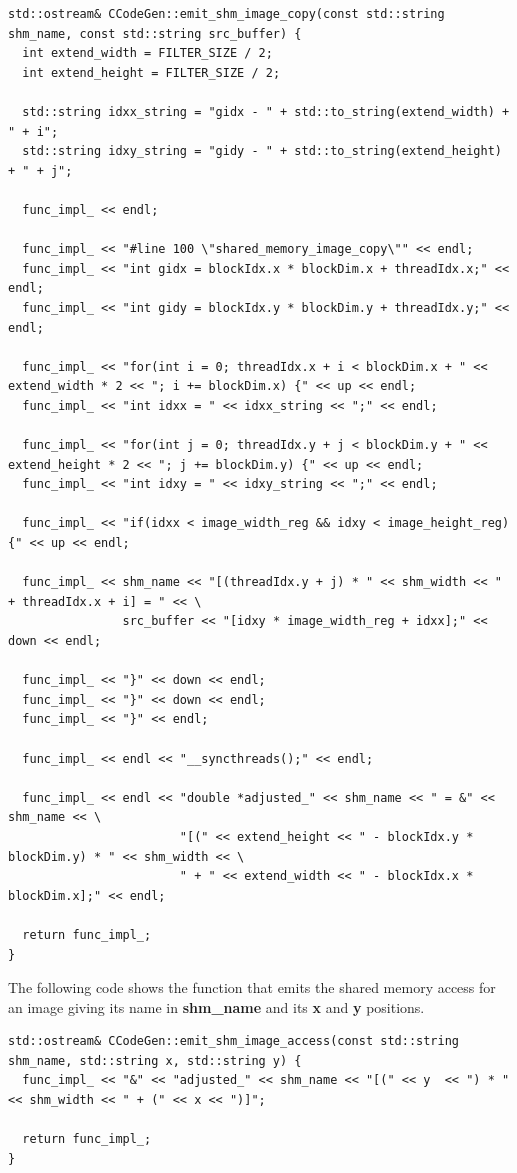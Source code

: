 \documentclass{article}
\begin{document}
\begin{verbatim}
std::ostream& CCodeGen::emit_shm_image_copy(const std::string shm_name, const std::string src_buffer) {
  int extend_width = FILTER_SIZE / 2;
  int extend_height = FILTER_SIZE / 2;

  std::string idxx_string = "gidx - " + std::to_string(extend_width) + " + i";
  std::string idxy_string = "gidy - " + std::to_string(extend_height) + " + j";

  func_impl_ << endl;

  func_impl_ << "#line 100 \"shared_memory_image_copy\"" << endl;
  func_impl_ << "int gidx = blockIdx.x * blockDim.x + threadIdx.x;" << endl;
  func_impl_ << "int gidy = blockIdx.y * blockDim.y + threadIdx.y;" << endl;

  func_impl_ << "for(int i = 0; threadIdx.x + i < blockDim.x + " << extend_width * 2 << "; i += blockDim.x) {" << up << endl;
  func_impl_ << "int idxx = " << idxx_string << ";" << endl;

  func_impl_ << "for(int j = 0; threadIdx.y + j < blockDim.y + " << extend_height * 2 << "; j += blockDim.y) {" << up << endl;
  func_impl_ << "int idxy = " << idxy_string << ";" << endl;

  func_impl_ << "if(idxx < image_width_reg && idxy < image_height_reg) {" << up << endl;

  func_impl_ << shm_name << "[(threadIdx.y + j) * " << shm_width << " + threadIdx.x + i] = " << \
                src_buffer << "[idxy * image_width_reg + idxx];" << down << endl;

  func_impl_ << "}" << down << endl;
  func_impl_ << "}" << down << endl;
  func_impl_ << "}" << endl;

  func_impl_ << endl << "__syncthreads();" << endl;

  func_impl_ << endl << "double *adjusted_" << shm_name << " = &" << shm_name << \
                        "[(" << extend_height << " - blockIdx.y * blockDim.y) * " << shm_width << \
                        " + " << extend_width << " - blockIdx.x * blockDim.x];" << endl;

  return func_impl_;
}
\end{verbatim}

The following code shows the function that emits the shared memory access for an image giving its name in \textbf{shm\_name} and its \textbf{x} and \textbf{y} positions.

\begin{verbatim}
std::ostream& CCodeGen::emit_shm_image_access(const std::string shm_name, std::string x, std::string y) {
  func_impl_ << "&" << "adjusted_" << shm_name << "[(" << y  << ") * " << shm_width << " + (" << x << ")]";

  return func_impl_;
}
\end{verbatim}
\end{document}
